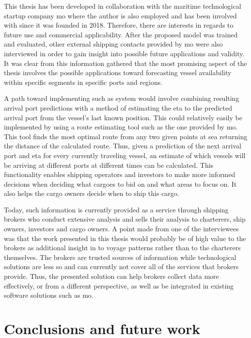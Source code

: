 This thesis has been developed in collaboration with the maritime technological startup company \acrfull{mo} where the author is also employed and has been involved with since it was founded in 2018. Therefore, there are interests in regards to future use and commercial applicability. After the proposed model was trained and evaluated, other external shipping contacts provided by \acrshort{mo} were also interviewed in order to gain insight into possible future applications and validity. It was clear from this information gathered that the most promising aspect of the thesis involves the possible applications toward forecasting vessel availability within specific segments in specific ports and regions.

A path toward implementing such as system would involve combining resulting arrival port predictions with a method of estimating the \acrfull{eta} to the predicted arrival port from the vessel's last known position. This could relatively easily be implemented by using a route estimating tool such as the one provided by \acrshort{mo}. This tool finds the most optimal route from any two given points at sea returning the distance of the calculated route. Thus, given a prediction of the next arrival port and \acrshort{eta} for every currently traveling vessel, an estimate of which vessels will be arriving at different ports at different times can be calculated. This functionality enables shipping operators and investors to make more informed decisions when deciding what cargoes to bid on and what areas to focus on. It also helps the cargo owners decide when to ship this cargo.

Today, such information is currently provided as a service through shipping brokers who conduct extensive analysis and sells their analysis to charterers, ship owners, investors and cargo owners. A point made from one of the interviewees was that the work presented in this thesis would probably be of high value to the brokers as additional insight in to voyage patterns rather than to the charterers themselves. The brokers are trusted sources of information while technological solutions are less so and can currently not cover all of the services that brokers provide. Thus, the presented solution can help brokers collect data more effectively, or from a different perspective, as well as be integrated in existing software solutions such as \acrshort{mo}.

\section{Conclusions and future work}

